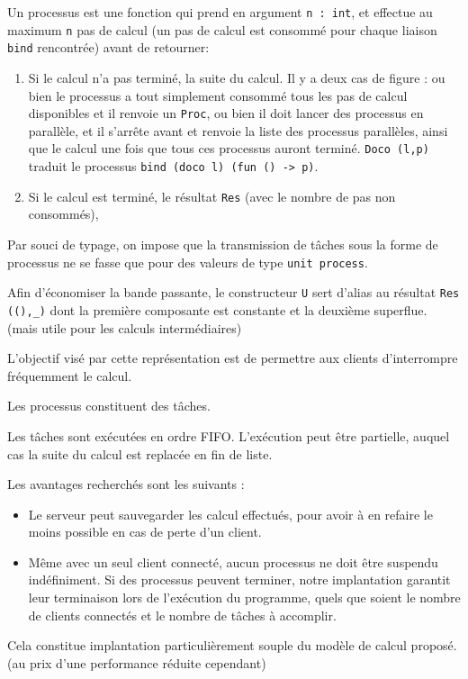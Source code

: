 \documentclass[11pt]{article}
\begin{document}
Un processus est une fonction qui prend en argument {\tt n : int},
et effectue au maximum {\tt n} pas de calcul
(un pas de calcul est consomm\'e pour chaque liaison {\tt bind} rencontr\'ee)
avant de retourner:

\begin{enumerate}
  \item Si le calcul n'a pas termin\'e, la suite du calcul.
    Il y a deux cas de figure : ou bien le processus a tout simplement
    consomm\'e tous les pas de calcul disponibles
    et il renvoie un {\tt Proc},
    ou bien il doit lancer des processus en parall\`ele, et il s'arr\^ete
    avant et renvoie la liste des processus parall\`eles,
    ainsi que le calcul une fois que tous ces processus auront termin\'e.
    {\tt Doco (l,p)} traduit le processus
    {\tt bind (doco l) (fun () -> p)}.
  \item Si le calcul est termin\'e, le r\'esultat {\tt Res}
    (avec le nombre de pas non consomm\'es),
\end{enumerate}

Par souci de typage, on impose que la transmission de
t\^aches sous la forme de processus ne se fasse que pour des valeurs
de type {\tt unit process}.

Afin d'\'economiser la bande passante,
le constructeur {\tt U} sert d'alias au r\'esultat {\tt Res ((),\_)}
dont la premi\`ere composante est constante et la deuxi\`eme superflue.
(mais utile pour les calculs interm\'ediaires)

\smallskip

L'objectif vis\'e par cette repr\'esentation est
de permettre aux clients d'interrompre fr\'equemment le calcul.

Les processus constituent des t\^aches.

Les t\^aches sont ex\'ecut\'ees en ordre FIFO.
L'ex\'ecution peut \^etre partielle,
auquel cas la suite du calcul est replac\'ee en fin de liste.

\smallskip

Les avantages recherch\'es sont les suivants :

\begin{itemize}
  \item Le serveur peut sauvegarder les calcul effectu\'es,
    pour avoir \`a en refaire le moins possible en cas de perte d'un client.
  \item M\^eme avec un seul client connect\'e,
    aucun processus ne doit \^etre suspendu ind\'efiniment.
    Si des processus peuvent terminer, notre implantation garantit leur
    terminaison lors de l'ex\'ecution du programme, quels que soient
    le nombre de clients connect\'es et le nombre de t\^aches \`a accomplir.
\end{itemize}

Cela constitue implantation particuli\`erement souple
du mod\`ele de calcul propos\'e.
(au prix d'une performance r\'eduite cependant)
\end{document}
